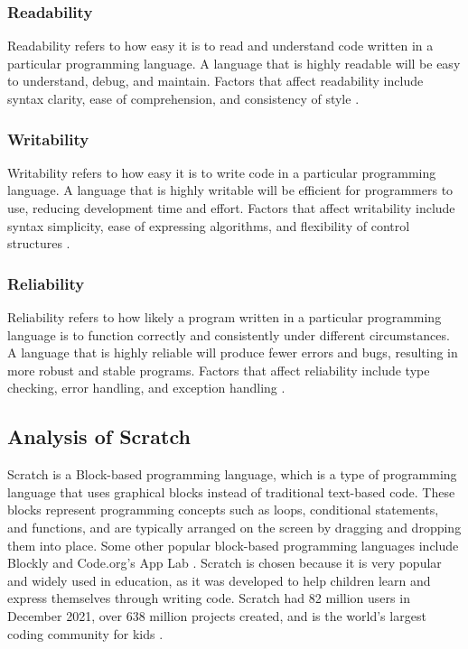 
\subsubsection{Readability}
Readability refers to how easy it is to read and understand code written in a particular programming language. A language that is highly readable will be easy to understand, debug, and maintain. Factors that affect readability include syntax clarity, ease of comprehension, and consistency of style \cite{conceptsofproglang}.

\subsubsection{Writability}
Writability refers to how easy it is to write code in a particular programming language. A language that is highly writable will be efficient for programmers to use, reducing development time and effort. Factors that affect writability include syntax simplicity, ease of expressing algorithms, and flexibility of control structures \cite{conceptsofproglang}.

\subsubsection{Reliability}
Reliability refers to how likely a program written in a particular programming language is to function correctly and consistently under different circumstances. A language that is highly reliable will produce fewer errors and bugs, resulting in more robust and stable programs. Factors that affect reliability include type checking, error handling, and exception handling \cite{conceptsofproglang}.

\subsection{Analysis of Scratch} \label{section:AnalysisBlockBasesLanguages}
Scratch is a Block-based programming language, which is a type of programming language that uses graphical blocks instead of traditional text-based code. These blocks represent programming concepts such as loops, conditional statements, and functions, and are typically arranged on the screen by dragging and dropping them into place. Some other popular block-based programming languages include Blockly and Code.org's App Lab \cite{popularblockbased}. Scratch is chosen because it is very popular and widely used in education, as it was developed to help children learn and express themselves through writing code. Scratch had 82 million users in December 2021, over 638 million projects created, and is the world's largest coding community for kids \cite{Scratchpopular}.\\


